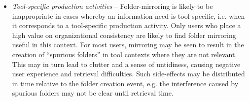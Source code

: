 \begin{itemize}

\item \textit{Tool-specific production activities} -- Folder-mirroring is likely to be inappropriate in cases whereby an information need is tool-specific, i.e. when it corresponds to a tool-specific production activity.  Only users who place a high value on organizational consistency are likely to find folder mirroring useful in this context. For most users, mirroring may be seen to result in the creation of ``spurious folders'' in tool contexts where they are not relevant.  This may in turn lead to clutter and a sense of untidiness, causing negative user experience and retrieval difficulties.
Such side-effects may be distributed in time relative to the folder creation event, e.g. the interference caused by spurious folders may not be clear until retrieval time.  %




\end{itemize}
